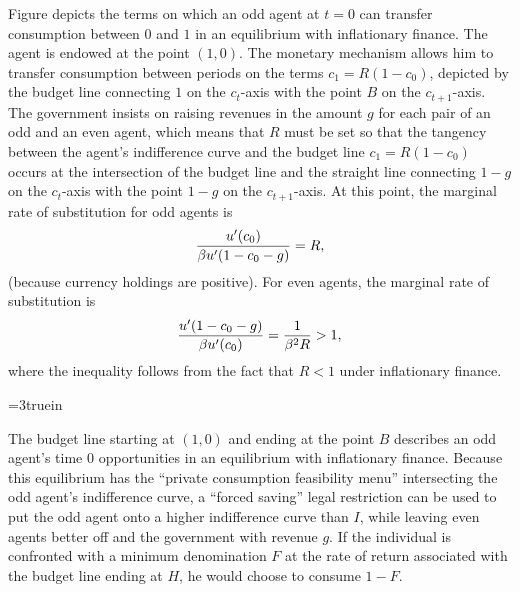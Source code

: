 Figure  %
 depicts the terms on which an odd agent at $t=0$ can transfer
consumption between $0$ and $1$ in an equilibrium with inflationary finance.
The agent is endowed at the point $(1,0)$.  The monetary mechanism allows
him to transfer consumption between periods on the terms $c_1 = R (1 - c_0)$,
depicted by the budget line connecting $1$ on the $c_t$-axis with the point $B$
on the $c_{t+1}$-axis.  The government insists on raising revenues in the
amount $g$ for each pair of an odd and an even agent, which means that $R$ must
be set so that the tangency between the agent's indifference curve and the budget
line $c_1=R(1-c_0)$ occurs at the intersection of the budget line and the straight
line connecting $1-g$ on the $c_t$-axis with the point $1-g$ on the $c_{t+1}$-axis.
At this point, the marginal rate of substitution for odd agents is
$${u'(c_0) \over \beta u'(1-c_0 -g)} = R,$$
(because currency holdings are positive).  For even agents, the
marginal rate of substitution is
$$ {u'(1-c_0-g) \over \beta u'(c_0)}= {1 \over \beta^2 R} > 1,$$
where the inequality follows from the fact that $R< 1$ under
inflationary finance.


\centerline{\epsfxsize=3truein}
\caption{The budget line starting at $(1,0)$ and ending at the point $B$
describes an odd agent's time $0$ opportunities in an equilibrium with
inflationary finance.  Because this equilibrium has the ``private
consumption feasibility menu'' intersecting the odd agent's indifference
curve, a ``forced saving'' legal restriction can be used to put the odd
agent onto a higher indifference curve than $I$, while leaving even agents
better off and the government with revenue $g$. If the individual is
confronted with a minimum denomination $F$ at the rate of return associated
with the budget line ending at $H$, he would choose to consume $1-F$.}
\endfigure

